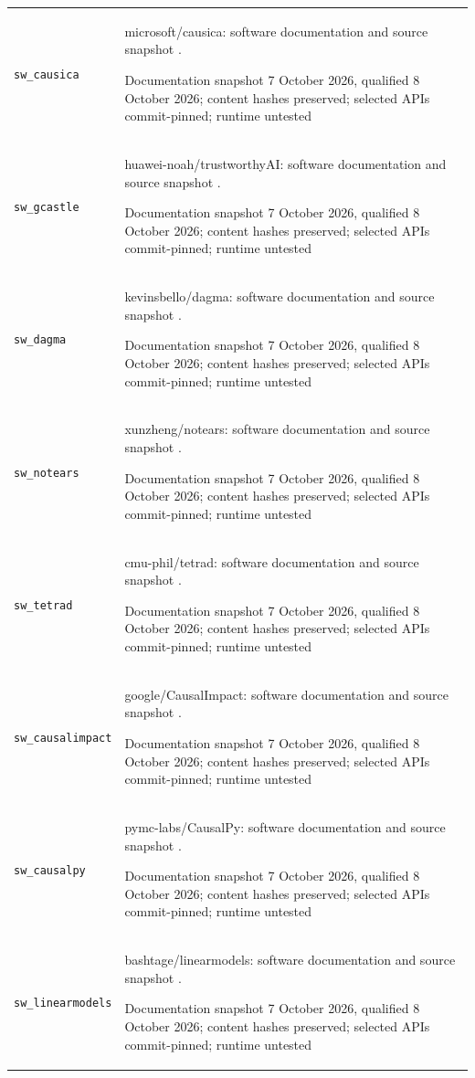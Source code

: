 \begin{longtable}{P{32mm}P{112mm}}
{\scriptsize\texttt{sw\_causica}} & microsoft/causica: software documentation and source snapshot \citep{sw_causica}.\par Documentation snapshot 7 October 2026, qualified 8 October 2026; content hashes preserved; selected APIs commit-pinned; runtime untested\\
{\scriptsize\texttt{sw\_gcastle}} & huawei-noah/trustworthyAI: software documentation and source snapshot \citep{sw_gcastle}.\par Documentation snapshot 7 October 2026, qualified 8 October 2026; content hashes preserved; selected APIs commit-pinned; runtime untested\\
{\scriptsize\texttt{sw\_dagma}} & kevinsbello/dagma: software documentation and source snapshot \citep{sw_dagma}.\par Documentation snapshot 7 October 2026, qualified 8 October 2026; content hashes preserved; selected APIs commit-pinned; runtime untested\\
{\scriptsize\texttt{sw\_notears}} & xunzheng/notears: software documentation and source snapshot \citep{sw_notears}.\par Documentation snapshot 7 October 2026, qualified 8 October 2026; content hashes preserved; selected APIs commit-pinned; runtime untested\\
{\scriptsize\texttt{sw\_tetrad}} & cmu-phil/tetrad: software documentation and source snapshot \citep{sw_tetrad}.\par Documentation snapshot 7 October 2026, qualified 8 October 2026; content hashes preserved; selected APIs commit-pinned; runtime untested\\
{\scriptsize\texttt{sw\_causalimpact}} & google/CausalImpact: software documentation and source snapshot \citep{sw_causalimpact}.\par Documentation snapshot 7 October 2026, qualified 8 October 2026; content hashes preserved; selected APIs commit-pinned; runtime untested\\
{\scriptsize\texttt{sw\_causalpy}} & pymc-labs/CausalPy: software documentation and source snapshot \citep{sw_causalpy}.\par Documentation snapshot 7 October 2026, qualified 8 October 2026; content hashes preserved; selected APIs commit-pinned; runtime untested\\
{\scriptsize\texttt{sw\_linearmodels}} & bashtage/linearmodels: software documentation and source snapshot \citep{sw_linearmodels}.\par Documentation snapshot 7 October 2026, qualified 8 October 2026; content hashes preserved; selected APIs commit-pinned; runtime untested\\

\end{longtable}
